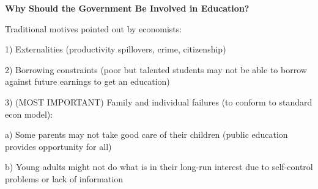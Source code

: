 \documentclass[landscape]{slides}
\begin{document}
\begin{slide}
\begin{center}
{\bf Why Should the Government Be Involved in Education?}
\end{center}
Traditional motives pointed out by economists:

1) Externalities (productivity spillovers, crime, citizenship)


2) Borrowing constraints (poor but talented students may not be able to borrow against
future earnings to get an education)

3) (MOST IMPORTANT) Family and individual failures (to conform to standard econ model):

a) Some parents may not take good care of their children (public education provides opportunity for all)

b) Young adults might not do what is in their long-run interest due to self-control problems or lack of information

\end{slide}

%
\end{document}
